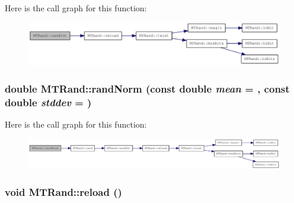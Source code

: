 Here is the call graph for this function:\nopagebreak
\begin{figure}[H]
\begin{center}
\leavevmode
\includegraphics[width=338pt]{classMTRand_ad1008efd4fe0e8aae30459c2c58cfe35_cgraph}
\end{center}
\end{figure}
\hypertarget{classMTRand_a4c284f626b6d40a0367ff2a949ea1944}{
\subsubsection[{randNorm}]{\setlength{\rightskip}{0pt plus 5cm}double MTRand::randNorm (const double {\em mean} = {}, \/  const double {\em stddev} = {})}}
\label{classMTRand_a4c284f626b6d40a0367ff2a949ea1944}


Here is the call graph for this function:\nopagebreak
\begin{figure}[H]
\begin{center}
\leavevmode
\includegraphics[width=420pt]{classMTRand_a4c284f626b6d40a0367ff2a949ea1944_cgraph}
\end{center}
\end{figure}
\hypertarget{classMTRand_a1d5fcb69d83f4d2fd653883c8352f86c}{
\subsubsection[{reload}]{\setlength{\rightskip}{0pt plus 5cm}void MTRand::reload ()}}
\label{classMTRand_a1d5fcb69d83f4d2fd653883c8352f86c}


